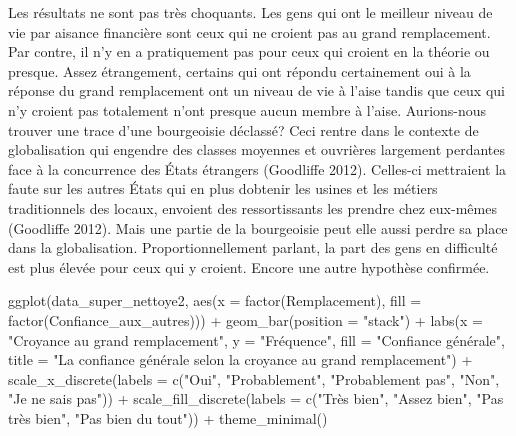 \documentclass[
  letterpaper,
  DIV=11,
  numbers=noendperiod]{scrartcl}
\newenvironment{Shaded}{\begin{snugshade}}{\end{snugshade}}
\newcommand{\AttributeTok}[1]{\textcolor[rgb]{0.40,0.45,0.13}{#1}}
\newcommand{\FunctionTok}[1]{\textcolor[rgb]{0.28,0.35,0.67}{#1}}
\newcommand{\NormalTok}[1]{\textcolor[rgb]{0.00,0.23,0.31}{#1}}
\newcommand{\SpecialCharTok}[1]{\textcolor[rgb]{0.37,0.37,0.37}{#1}}
\newcommand{\StringTok}[1]{\textcolor[rgb]{0.13,0.47,0.30}{#1}}
\begin{document}
Les résultats ne sont pas très choquants. Les gens qui ont le meilleur
niveau de vie par aisance financière sont ceux qui ne croient pas au
grand remplacement. Par contre, il n'y en a pratiquement pas pour ceux
qui croient en la théorie ou presque. Assez étrangement, certains qui
ont répondu certainement oui à la réponse du grand remplacement ont un
niveau de vie à l'aise tandis que ceux qui n'y croient pas totalement
n'ont presque aucun membre à l'aise. Aurions-nous trouver une trace
d'une bourgeoisie déclassé? Ceci rentre dans le contexte de
globalisation qui engendre des classes moyennes et ouvrières largement
perdantes face à la concurrence des États étrangers (Goodliffe 2012).
Celles-ci mettraient la faute sur les autres États qui en plus
d\textquotesingle obtenir les usines et les métiers traditionnels des
locaux, envoient des ressortissants les prendre chez eux-mêmes
(Goodliffe 2012). Mais une partie de la bourgeoisie peut elle aussi
perdre sa place dans la globalisation. Proportionnellement parlant, la
part des gens en difficulté est plus élevée pour ceux qui y croient.
Encore une autre hypothèse confirmée.

\begin{Shaded}
\begin{Highlighting}[]
\FunctionTok{ggplot}\NormalTok{(data\_super\_nettoye2, }\FunctionTok{aes}\NormalTok{(}\AttributeTok{x =} \FunctionTok{factor}\NormalTok{(Remplacement), }\AttributeTok{fill =} \FunctionTok{factor}\NormalTok{(Confiance\_aux\_autres))) }\SpecialCharTok{+}
  \FunctionTok{geom\_bar}\NormalTok{(}\AttributeTok{position =} \StringTok{"stack"}\NormalTok{) }\SpecialCharTok{+}
  \FunctionTok{labs}\NormalTok{(}\AttributeTok{x =} \StringTok{"Croyance au grand remplacement"}\NormalTok{, }\AttributeTok{y =} \StringTok{"Fréquence"}\NormalTok{, }\AttributeTok{fill =} \StringTok{"Confiance générale"}\NormalTok{, }\AttributeTok{title =} \StringTok{"La confiance générale selon la croyance au grand remplacement"}\NormalTok{) }\SpecialCharTok{+}
  \FunctionTok{scale\_x\_discrete}\NormalTok{(}\AttributeTok{labels =} \FunctionTok{c}\NormalTok{(}\StringTok{"Oui"}\NormalTok{, }\StringTok{"Probablement"}\NormalTok{, }\StringTok{"Probablement pas"}\NormalTok{, }\StringTok{"Non"}\NormalTok{, }\StringTok{"Je ne sais pas"}\NormalTok{)) }\SpecialCharTok{+}
  \FunctionTok{scale\_fill\_discrete}\NormalTok{(}\AttributeTok{labels =} \FunctionTok{c}\NormalTok{(}\StringTok{"Très bien"}\NormalTok{, }\StringTok{"Assez bien"}\NormalTok{, }\StringTok{"Pas très bien"}\NormalTok{, }\StringTok{"Pas bien du tout"}\NormalTok{)) }\SpecialCharTok{+}
  \FunctionTok{theme\_minimal}\NormalTok{()}
\end{Highlighting}
\end{Shaded}
\end{document}

